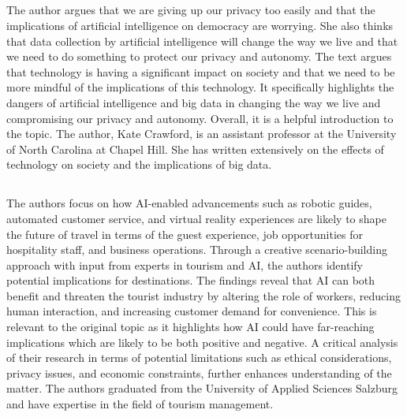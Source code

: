 \documentclass[12pt,letterpaper]{article}
\begin{document}
\subsection*{}
The author argues that we are giving up our privacy too easily and that the implications of artificial intelligence on democracy are worrying. She also thinks that data collection by artificial intelligence will change the way we live and that we need to do something to protect our privacy and autonomy. The text argues that technology is having a significant impact on society and that we need to be more mindful of the implications of this technology. It specifically highlights the dangers of artificial intelligence and big data in changing the way we live and compromising our privacy and autonomy. Overall, it is a helpful introduction to the topic. The author, Kate Crawford, is an assistant professor at the University of North Carolina at Chapel Hill. She has written extensively on the effects of technology on society and the implications of big data. 


\subsection*{}
The authors focus on how AI-enabled advancements such as robotic guides, automated customer service, and virtual reality experiences are likely to shape the future of travel in terms of the guest experience, job opportunities for hospitality staff, and business operations. Through a creative scenario-building approach with input from experts in tourism and AI, the authors identify potential implications for destinations. The findings reveal that AI can both benefit and threaten the tourist industry by altering the role of workers, reducing human interaction, and increasing customer demand for convenience. This is relevant to the original topic as it highlights how AI could have far-reaching implications which are likely to be both positive and negative. A critical analysis of their research in terms of potential limitations such as ethical considerations, privacy issues, and economic constraints, further enhances understanding of the matter. The authors graduated from the University of Applied Sciences Salzburg and have expertise in the field of tourism management.
\end{document}
